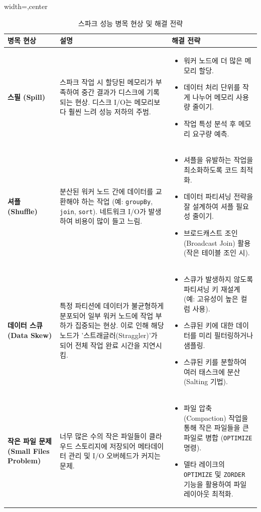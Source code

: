\documentclass[11pt,a4paper]{article}
\theoremstyle{definition}
\begin{document}
\begin{table}[htbp]
\centering
\caption{스파크 성능 병목 현상 및 해결 전략}
\label{tab:spark_bottlenecks}
\begin{adjustbox}{width=\textwidth,center}
\begin{tabular}{p{3cm} p{5cm} p{7cm}}
\toprule
\textbf{병목 현상} & \textbf{설명} & \textbf{해결 전략} \\
\midrule
\textbf{스필 (Spill)} & 스파크 작업 시 할당된 메모리가 부족하여 중간 결과가 디스크에 기록되는 현상. 디스크 I/O는 메모리보다 훨씬 느려 성능 저하의 주범. &
\begin{itemize}
    \item 워커 노드에 더 많은 메모리 할당.
    \item 데이터 처리 단위를 작게 나누어 메모리 사용량 줄이기.
    \item 작업 특성 분석 후 메모리 요구량 예측.
\end{itemize} \\
\textbf{셔플 (Shuffle)} & 분산된 워커 노드 간에 데이터를 교환해야 하는 작업 (예: \texttt{groupBy}, \texttt{join}, \texttt{sort}). 네트워크 I/O가 발생하여 비용이 많이 들고 느림. &
\begin{itemize}
    \item 셔플을 유발하는 작업을 최소화하도록 코드 최적화.
    \item 데이터 파티셔닝 전략을 잘 설계하여 셔플 필요성 줄이기.
    \item 브로드캐스트 조인(Broadcast Join) 활용 (작은 테이블 조인 시).
\end{itemize} \\
\textbf{데이터 스큐 (Data Skew)} & 특정 파티션에 데이터가 불균형하게 분포되어 일부 워커 노드에 작업 부하가 집중되는 현상. 이로 인해 해당 노드가 '스트래글러(Straggler)'가 되어 전체 작업 완료 시간을 지연시킴. &
\begin{itemize}
    \item 스큐가 발생하지 않도록 파티셔닝 키 재설계 (예: 고유성이 높은 컬럼 사용).
    \item 스큐된 키에 대한 데이터를 미리 필터링하거나 샘플링.
    \item 스큐된 키를 분할하여 여러 태스크에 분산 (Salting 기법).
\end{itemize} \\
\textbf{작은 파일 문제 (Small Files Problem)} & 너무 많은 수의 작은 파일들이 클라우드 스토리지에 저장되어 메타데이터 관리 및 I/O 오버헤드가 커지는 문제. &
\begin{itemize}
    \item 파일 압축(Compaction) 작업을 통해 작은 파일들을 큰 파일로 병합 (\texttt{OPTIMIZE} 명령).
    \item 델타 레이크의 \texttt{OPTIMIZE} 및 \texttt{ZORDER} 기능을 활용하여 파일 레이아웃 최적화.
\end{itemize} \\
\bottomrule
\end{tabular}
\end{adjustbox}
\end{table}
\end{document}
